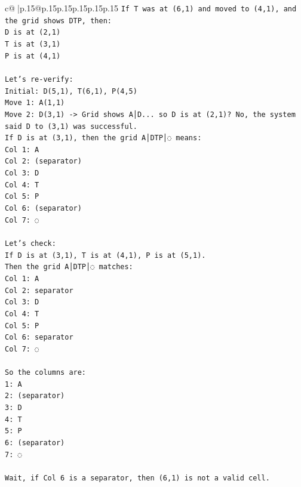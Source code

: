 \documentclass{article}
\begin{document}
{\begin{supertabular}{c@{$\;$}|p{.15\linewidth}@{}p{.15\linewidth}p{.15\linewidth}p{.15\linewidth}p{.15\linewidth}p{.15\linewidth}}
{{{\texttt{If T was at (6,1) and moved to (4,1), and the grid shows DTP, then:} \\
\texttt{D is at (2,1)} \\
\texttt{T is at (3,1)} \\
\texttt{P is at (4,1)} \\
\\ 
\texttt{Let's re{-}verify:} \\
\texttt{Initial: D(5,1), T(6,1), P(4,5)} \\
\texttt{Move 1: A(1,1)} \\
\texttt{Move 2: D(3,1) {-}> Grid shows A│D... so D is at (2,1)? No, the system said D to (3,1) was successful.} \\
\texttt{If D is at (3,1), then the grid A│DTP│◌ means:} \\
\texttt{Col 1: A} \\
\texttt{Col 2: (separator)} \\
\texttt{Col 3: D} \\
\texttt{Col 4: T} \\
\texttt{Col 5: P} \\
\texttt{Col 6: (separator)} \\
\texttt{Col 7: ◌} \\
\\ 
\texttt{Let's check:} \\
\texttt{If D is at (3,1), T is at (4,1), P is at (5,1).} \\
\texttt{Then the grid A│DTP│◌ matches:} \\
\texttt{Col 1: A} \\
\texttt{Col 2: separator} \\
\texttt{Col 3: D} \\
\texttt{Col 4: T} \\
\texttt{Col 5: P} \\
\texttt{Col 6: separator} \\
\texttt{Col 7: ◌} \\
\\ 
\texttt{So the columns are:} \\
\texttt{1: A} \\
\texttt{2: (separator)} \\
\texttt{3: D} \\
\texttt{4: T} \\
\texttt{5: P} \\
\texttt{6: (separator)} \\
\texttt{7: ◌} \\
\\ 
\texttt{Wait, if Col 6 is a separator, then (6,1) is not a valid cell.} \\
}}}
\end{supertabular}}
\end{document}
